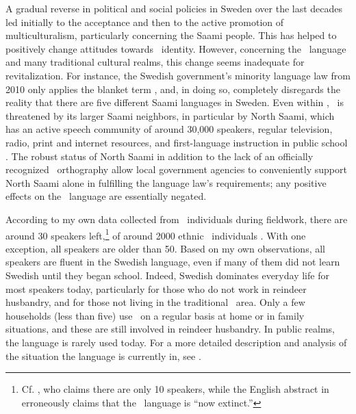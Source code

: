 A gradual reverse in political and social policies in Sweden over the last decades led initially to the acceptance and then to the active promotion of multiculturalism, particularly concerning the Saami people. This has helped to positively change attitudes towards \PS\ identity. However, concerning the \PS\ language and many traditional cultural realms, this change seems inadequate for revitalization. For instance, the Swedish government's minority language law from 2010 only applies the blanket term , and, in doing so, completely disregards the reality that there are five different Saami languages in Sweden. Even within , \PS\ is threatened by its larger Saami neighbors, in particular by North Saami, which has an active speech community of around 30,000 speakers, regular television, radio, print and internet resources, and first-language instruction in public school \citep[cf.][209-211]{Salminen2007}. The robust status of North Saami in addition to the lack of an officially recognized \PS\ orthography allow local government agencies to conveniently support North Saami alone in fulfilling the language law's requirements; any positive effects on the \PS\ language are essentially negated.

According to my own data collected from \PS\ individuals during fieldwork, there are around 30 speakers left,\footnote{Cf. \citet[221]{Salminen2007}, who claims there are only 10 speakers, while the English abstract in \citet{Lehtiranta1992} erroneously claims that the \PS\ language is “now extinct.”} 
of around 2000 ethnic \PS\ individuals \citep[24]{Krauss1997}. With one exception, all speakers are older than 50. %
Based on my own observations, all speakers are fluent in the Swedish language, even if many of them did not learn Swedish until they began school. Indeed, Swedish dominates everyday life for most speakers today, particularly for those who do not work in reindeer husbandry, and for those not living in the traditional \PS\ area. Only a few households (less than five) use \PS\ on a regular basis at home or in family situations, and these are still involved in reindeer husbandry. In public realms, the language is rarely used today. For a more detailed description and analysis of the situation the language is currently in, see \citet{ValijarviWilbur2011}.

\FloatBarrier

